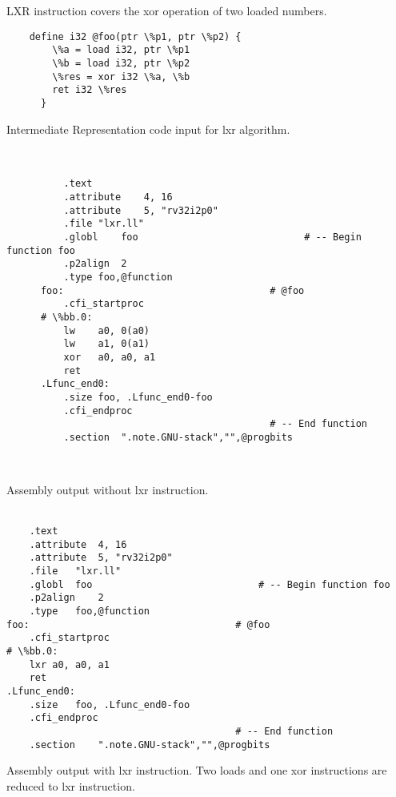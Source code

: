LXR instruction covers the xor operation of two loaded numbers.
\\


\begin{lstlisting}
    define i32 @foo(ptr \%p1, ptr \%p2) {
        \%a = load i32, ptr \%p1
        \%b = load i32, ptr \%p2
        \%res = xor i32 \%a, \%b
        ret i32 \%res
      }
\end{lstlisting}

Intermediate Representation code input for lxr algorithm.
\\\\

\begin{lstlisting}
      
          .text
          .attribute	4, 16
          .attribute	5, "rv32i2p0"
          .file	"lxr.ll"
          .globl	foo                             # -- Begin function foo
          .p2align	2
          .type	foo,@function
      foo:                                    # @foo
          .cfi_startproc
      # \%bb.0:
          lw	a0, 0(a0)
          lw	a1, 0(a1)
          xor	a0, a0, a1
          ret
      .Lfunc_end0:
          .size	foo, .Lfunc_end0-foo
          .cfi_endproc
                                              # -- End function
          .section	".note.GNU-stack","",@progbits
      
      
\end{lstlisting}

Assembly output without lxr instruction.
\\\\


\begin{lstlisting}
    .text
	.attribute	4, 16
	.attribute	5, "rv32i2p0"
	.file	"lxr.ll"
	.globl	foo                             # -- Begin function foo
	.p2align	2
	.type	foo,@function
foo:                                    # @foo
	.cfi_startproc
# \%bb.0:
	lxr	a0, a0, a1
	ret
.Lfunc_end0:
	.size	foo, .Lfunc_end0-foo
	.cfi_endproc
                                        # -- End function
	.section	".note.GNU-stack","",@progbits
\end{lstlisting}

Assembly output with lxr instruction. Two loads and one xor instructions are reduced to lxr instruction.
\\\\
